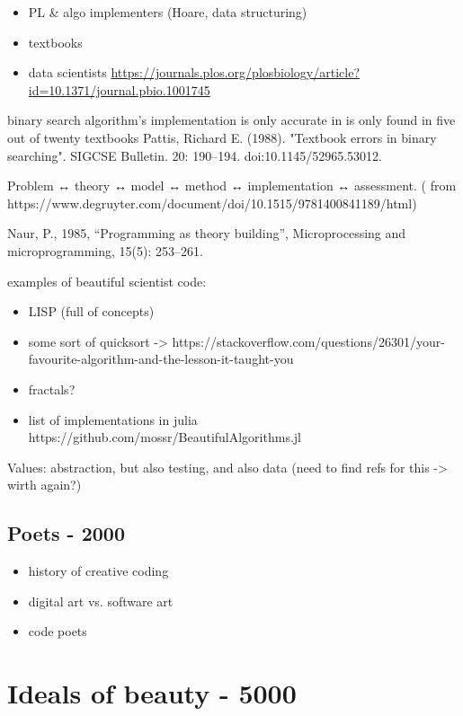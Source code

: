 \begin{itemize}
    \item PL \& algo implementers (Hoare, data structuring)
    \item textbooks
    \item data scientists \url{https://journals.plos.org/plosbiology/article?id=10.1371/journal.pbio.1001745}
\end{itemize}

binary search algorithm's implementation is only accurate in  is only found in five out of twenty textbooks Pattis, Richard E. (1988). "Textbook errors in binary searching". SIGCSE Bulletin. 20: 190–194. doi:10.1145/52965.53012.

Problem ↔ theory ↔ model ↔ method ↔ implementation ↔ assessment. ( from https://www.degruyter.com/document/doi/10.1515/9781400841189/html)

Naur, P., 1985, “Programming as theory building”, Microprocessing and microprogramming, 15(5): 253–261.

examples of beautiful scientist code:

\begin{itemize}
    \item LISP (full of concepts)
    \item some sort of quicksort -> https://stackoverflow.com/questions/26301/your-favourite-algorithm-and-the-lesson-it-taught-you
    \item fractals?
    \item list of implementations in julia https://github.com/mossr/BeautifulAlgorithms.jl
\end{itemize}

Values: abstraction, but also testing, and also data (need to find refs for this -> wirth again?)

\subsection{Poets - 2000}

\begin{itemize}
    \item history of creative coding
    \item digital art vs. software art
    \item code poets
\end{itemize}


\section{Ideals of beauty - 5000}

